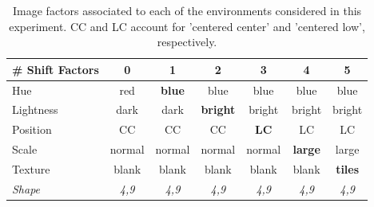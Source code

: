 \begin{table}[H]
    \centering
    \begin{tabular}{l|c|c|c|c|c|c}
    \# Shift Factors & 0 & 1 & 2 & 3 & 4 & 5 \\
    \midrule
    Hue & red & \textbf{blue} & blue & blue & blue & blue \\
    Lightness & dark & dark & \textbf{bright} & bright & bright & bright \\
    Position  & CC & CC & CC & \textbf{LC} & LC & LC \\
    Scale  & normal & normal & normal & normal & \textbf{large} & large \\
    Texture & blank & blank & blank & blank & blank & \textbf{tiles} \\
    \textit{Shape} & \textit{4,9} &  \textit{4,9} &  \textit{4,9} & \textit{4,9} & \textit{4,9} & \textit{4,9} \\
    \bottomrule
    \end{tabular}
    \caption{
    Image factors associated to each of the environments considered in this experiment. CC and LC account
    for 'centered center' and 'centered low', respectively.
    }
    \label{tab:data_shift_table}
\end{table}


